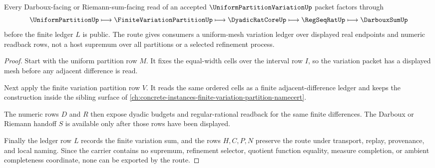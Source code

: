 \begin{theorem}
\label{thm:uniform-partition-variation-darboux-route}
Every Darboux-facing or Riemann-sum-facing read of an accepted $\UniformPartitionVariationUp$ packet factors through
$$
\UniformPartitionUp \longmapsto \FiniteVariationPartitionUp \longmapsto \DyadicRatCoreUp \longmapsto \RegSeqRatUp \longmapsto \DarbouxSumUp
$$
before the finite ledger $L$ is public. The route gives consumers a uniform-mesh variation ledger over displayed real endpoints and numeric readback rows, not a host supremum over all partitions or a selected refinement process.
\end{theorem}
\begin{proof}
Start with the uniform partition row $M$. It fixes the equal-width cells over the interval row $I$, so the variation packet has a displayed mesh before any adjacent difference is read.

Next apply the finite variation partition row $V$. It reads the same ordered cells as a finite adjacent-difference ledger and keeps the construction inside the sibling surface of \autoref{ch:concrete-instances-finite-variation-partition-namecert}.

The numeric rows $D$ and $R$ then expose dyadic budgets and regular-rational readback for the same finite differences. The Darboux or Riemann handoff $S$ is available only after those rows have been displayed.

Finally the ledger row $L$ records the finite variation sum, and the rows $H,C,P,N$ preserve the route under transport, replay, provenance, and local naming. Since the carrier contains no supremum, refinement selector, quotient function equality, measure completion, or ambient completeness coordinate, none can be exported by the route.
\end{proof}


